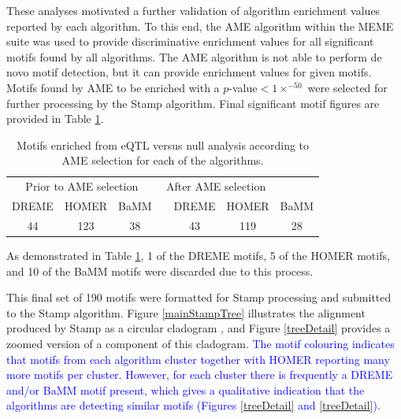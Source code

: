\documentclass[12pt]{article}
\begin{document}
These analyses motivated a further validation of algorithm enrichment values reported by each algorithm. To this end, the AME algorithm \citep{Buske2010} within the MEME suite  was used to provide discriminative enrichment values for all significant motifs found by all algorithms. The AME algorithm is not able to perform de novo motif detection, but it can provide enrichment values for given motifs. Motifs found by AME to be enriched with a $p$-value$<1\times^{-50}$ were selected for further processing by the Stamp algorithm. Final significant motif figures are provided in Table \ref{ameResults}.

\begin{table}[!htbp]
\caption{Motifs enriched from eQTL versus null analysis according to AME selection for each of the algorithms.}
\label{ameResults}
\centering
\begin{tabular}{ccccccc}
\toprule[0.2em]
\multicolumn{3}{c}{Prior to AME selection} & \multicolumn{3}{c}{After AME selection}\\
\cmidrule[0.1em]{1-3}
\cmidrule[0.1em]{5-7}
DREME & HOMER & BaMM && DREME & HOMER & BaMM\\
44 & 123 & 38 && 43 & 119 & 28\\
\bottomrule[0.2em]
\end{tabular}
\end{table}
\newpage
As demonstrated in Table \ref{ameResults}, 1 of the DREME motifs, 5 of the HOMER motifs, and 10 of the BaMM motifs were discarded due to this process. 

This final set of 190 motifs were formatted for Stamp processing and submitted to the Stamp algorithm. Figure \ref{mainStampTree} illustrates the alignment produced by Stamp as a circular cladogram \citep{He2016}, and Figure \ref{treeDetail} provides a zoomed version of a component of this cladogram.   \textcolor{blue}{The motif colouring indicates that motifs from each algorithm cluster together with HOMER reporting many more motifs per cluster. However, for each cluster
there is frequently a DREME and/or BaMM motif present, which gives a qualitative indication that the algorithms are detecting similar motifs (Figures \ref{treeDetail} and \ref{treeDetail}).}
\end{document}
